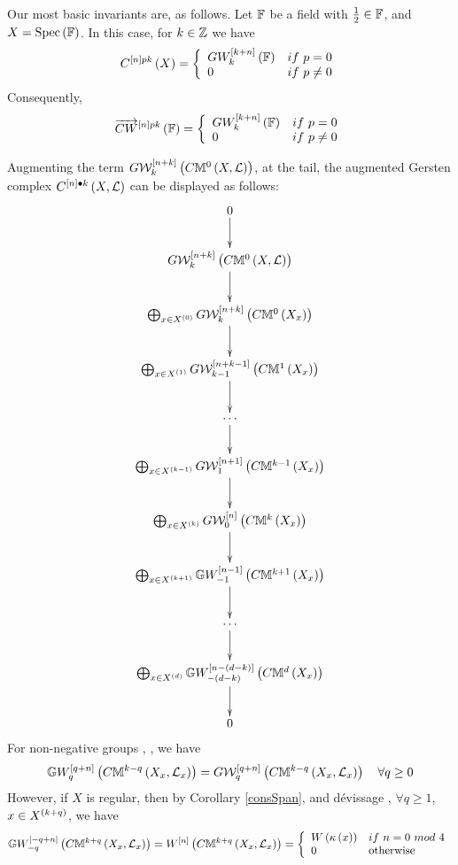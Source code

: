 \documentclass[12pt]{article}
\begin{document}
\eD
Our most basic invariants are, as follows.
\bExr\label{milJinh}{\rm 
Let ${\BF}$ be a field with $\frac{1}{2} \in {\BF}$, and $X=\spec{{\BF}}$. In this case, for 
$k\in {\BZ}$ we have 
$$
C^{\LRt{n}pk}\LRf{X}= \LBrace{{ll}
GW_k^{\LRt{k+n}}\LRf{{\BF}} & if~p=0\\
0 & if ~p\neq 0\\
}
$$
Consequently, 
$$
\ora{CW}^{\LRt{n}pk}\LRf{{\BF}}= \LBrace{{ll}
GW_k^{\LRt{k+n}}\LRf{{\BF}} & if~p=0\\
0 & if ~p\neq 0\\
}
$$
}
\eExr

Augmenting the term $ G{\CW}^{\LRt{n+k}}_k\LRf{C{\BM}^0\LRf{X, {\CL}}}$,
at the tail,  the augmented Gersten complex %
$C^{\LRt{n}{\bul}k}\LRf{X, {\CL}}$ can be displayed as follows: 
% 
$$
\diagram
0 \ar[d]\\
 G{\CW}^{\LRt{n+k}}_k\LRf{C{\BM}^0\LRf{X, {\CL}}}\ar[d]\\
\bigoplus_{x\in X^{\LRf{0}}}G{\CW}^{\LRt{n+k}}_k\LRf{C{\BM}^0\LRf{X_x}}\ar[d]\\
\bigoplus_{x\in X^{\LRf{1}}}G{\CW}^{\LRt{n+k-1}}_{k-1}\LRf{C{\BM}^1\LRf{X_x}}\ar[d]\\
\cdots\ar[d]\\
\bigoplus_{x\in X^{\LRf{k-1}}}G{\CW}^{\LRt{n+1}}_{1}\LRf{C{\BM}^{k-1}\LRf{X_x}}\ar[d] \\
%
\bigoplus_{x\in X^{\LRf{k}}}G{\CW}^{\LRt{n}}_{0}\LRf{C{\BM}^k\LRf{X_x}}\ar[d]\\ %
% 
\bigoplus_{x\in X^{\LRf{k+1}}}{\BG}W_{-1}^{\LRt{n-1}}\LRf{C{\BM}^{k+1}\LRf{X_x}} \ar[d]\\
%
\cdots\ar[d]\\
\bigoplus_{x\in X^{\LRf{d}}}{\BG}W_{-(d-k)}^{\LRt{n-(d-k)}}\LRf{C{\BM}^d\LRf{X_x}} \ar[d] \\
0\\
\enddiagram
$$
% 
For non-negative groups \cite[pp 1799]{S17},
\cite[pp 466]{M23}, we have 
$$
 {\BG}W_q^{\LRt{q+n}}\LRf{C{\BM}^{k-q}\LRf{X_x, {\CL}_x}}= {G}{\CW}_q^{\LRt{q+n}}\LRf{C{\BM}^{k-q}\LRf{X_x, {\CL}_x}}
\quad \forall q\geq 0
$$
However, if $X$ is regular, then by Corollary \ref{consSpan}, \cite[pp 1785]{S17} and d\'{e}vissage \cite{BW2}, 
$\forall q\geq 1$, $x\in X^{\LRf{k+q}}$, we have 
$$
 {\BG}W_{-q}^{\LRt{-q+n}}\LRf{C{\BM}^{k+q}\LRf{X_x, {\CL}_x}}=
 W^{\LRt{n}}\LRf{C{\BM}^{k+q}\LRf{X_x, {\CL}_x}} =
 \LBrace{{ll}
 W\LRf{\kappa\LRf{x}} & if~n=0 ~mod~4\\
 0 & {\rm otherwise}\\
 }
$$
\end{document}
